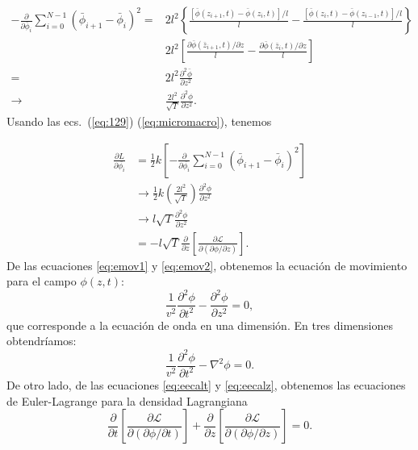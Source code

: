 \begin{align}
  -\frac{\partial}{\partial\bar\phi_i}  \sum_{i=0}^{N-1}\left(\bar\phi_{i+1}-\bar\phi_{i}\right)^2
  =&2l^2\left\{\frac{[\bar\phi(z_{i+1},t)-\bar\phi(z_{i},t)]/l}{l}-\frac{[\bar\phi(z_{i},t)-\bar\phi(z_{i-1},t)]/l}{l}\right\}\nonumber\\
&2l^2\left[\frac{\partial\bar\phi(\bar z_{i+1},t)/\partial z}{l}-\frac{\partial\bar\phi(\bar z_{i},t)/\partial z}{l}\right]\nonumber\\
  =&2l^2\frac{\partial^2\bar\phi}{\partial z^2}\nonumber\\
  \label{eq:129}
  \to&\frac{2l^2}{\sqrt{T}}\frac{\partial^2\phi}{\partial z^2}.
\end{align}
Usando las ecs.~(\ref{eq:129}) (\ref{eq:micromacro}), tenemos

\begin{align}
  \label{eq:emov2}
  \frac{\partial L}{\partial\bar{\phi_i}}
&=\frac{1}{2}k
\left[-\frac{\partial}{\partial\bar{\phi_i}}\sum_{i=0}^{N-1}\left(\bar\phi_{i+1}-\bar\phi_{i}\right)^2\right]
\nonumber\\
&\to\frac{1}{2}k\left(\frac{2l^2}{\sqrt{T}}\right)\frac{\partial^2\phi}{\partial z^2}
\nonumber\\
&\to  l\sqrt{T}
      \frac{\partial^2\phi}{\partial z^2}\\
  \label{eq:eecalz}
  &=-l\sqrt{T}\frac{\partial}{\partial z}
  \left[
    \frac{\partial\mathcal{L}}{\partial
      (\partial\phi/\partial z)}
  \right].
\end{align}
De las ecuaciones \eqref{eq:emov1} y \eqref{eq:emov2}, obtenemos la
ecuación de movimiento para el campo $\phi(z,t)$:
\begin{equation}
  \label{eq:econda1}
    \frac{1}{v^2}\frac{\partial^2\phi}{\partial t^2}-\frac{\partial^2\phi}{\partial z^2}=0,
\end{equation}
que corresponde a la ecuación de onda en una dimensión. En tres
dimensiones obtendríamos:
\begin{equation}
  \label{eq:econda3}
    \frac{1}{v^2}\frac{\partial^2\phi}{\partial t^2}-\nabla^2\phi=0.
\end{equation}
De otro lado, de las ecuaciones 
\eqref{eq:eecalt} %
y \eqref{eq:eecalz}, %
obtenemos las ecuaciones de Euler-Lagrange para la densidad Lagrangiana
\begin{equation}
  \label{eq:eelcalls1}
\frac{\partial}{\partial t}
  \left[
    \frac{\partial\mathcal{L}}{\partial
      (\partial\phi/\partial t)}
  \right]+  \frac{\partial}{\partial z}
  \left[
    \frac{\partial\mathcal{L}}{\partial
      (\partial\phi/\partial z)}
  \right]=0.
\end{equation}
